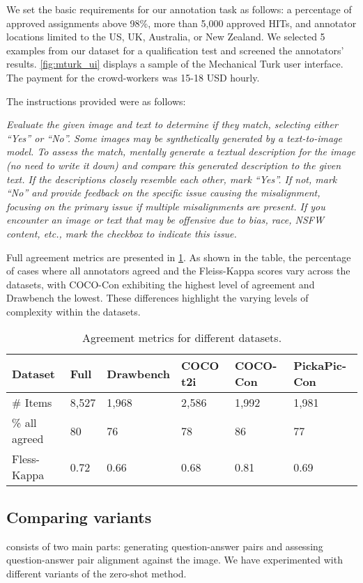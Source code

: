 \documentclass{article}
\begin{document}
We set the basic requirements for our annotation task as follows: a percentage of approved assignments above 98\%, more than 5,000 approved HITs, and annotator locations limited to the US, UK, Australia, or New Zealand. We selected 5 examples from our dataset for a qualification test and screened the annotators' results.
\cref{fig:mturk_ui} displays a sample of the Mechanical Turk user interface. The payment for the crowd-workers was 15-18 USD hourly. 

The instructions provided were as follows:

\textit{Evaluate the given image and text to determine if they match, selecting either “Yes” or “No”. Some images may be synthetically generated by a text-to-image model. To assess the match, mentally generate a textual description for the image (no need to write it down) and compare this generated description to the given text. If the descriptions closely resemble each other, mark “Yes”. If not, mark “No” and provide feedback on the specific issue causing the misalignment, focusing on the primary issue if multiple misalignments are present. If you encounter an image or text that may be offensive due to bias, race, NSFW content, etc., mark the checkbox to indicate this issue.}

Full agreement metrics are presented in \cref{tab:agreement}. As shown in the table, the percentage of cases where all annotators agreed and the Fleiss-Kappa scores vary across the datasets, with COCO-Con exhibiting the highest level of agreement and Drawbench the lowest. These differences highlight the varying levels of complexity within the datasets.

\begin{table}[!h]
\centering
\caption{Agreement metrics for different datasets.}
\label{tab:agreement}
\begin{tabular}{@{}llllll@{}}
\toprule
Dataset       & Full  & Drawbench & COCO t2i & COCO-Con & PickaPic-Con \\ \midrule
\# Items      & 8,527 & 1,968     & 2,586    & 1,992    & 1,981        \\
\% all agreed & 80    & 76        & 78       & 86       & 77           \\
Fless-Kappa   & 0.72  & 0.66      & 0.68     & 0.81     & 0.69         \\ \bottomrule
\end{tabular}
\end{table}

\subsection{\texorpdfstring{Comparing  variants}{Comparing VQ2 variants}}
\label{sec:vq2_ablations}
 consists of two main parts: generating question-answer pairs and assessing question-answer pair alignment against the image. We have experimented with different variants of the  zero-shot method.
\end{document}
